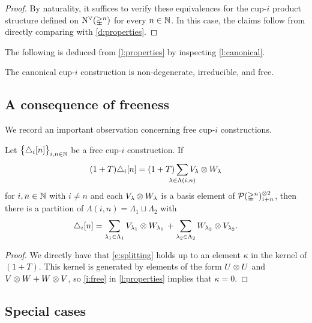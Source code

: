 \begin{proof}
	By naturality, it suffices to verify these equivalences for the \mbox{cup-$i$} product structure defined on $\operatorname{N^{\vee}}(\mathbb{\Delta}^n)$ for every $n \in \mathbb{N}$.
	In this case, the claims follow from directly comparing with \cref{d:properties}.
\end{proof}

The following is deduced from \cref{l:properties} by inspecting \cref{l:canonical}.

\begin{theorem} \label{t:existence}
	The canonical \mbox{cup-$i$} construction is non-degenerate, irreducible, and free.
\end{theorem}

\subsection{A consequence of freeness} \label{ss:consequence}

We record an important observation concerning free cup-$i$ constructions.

\begin{lemma} \label{l:consequence}
	Let $\big\{ \triangle_i [n] \big\}_{i,n\in\mathbb{N}}$ be a free \mbox{cup-$i$} construction.
	If
	\[
	(1+T) \triangle_i [n] =
	(1+T) \sum_{\mathclap{\lambda \in \Lambda(i,n)}} V_\lambda \ot W_\lambda
	\]
	for $i,n \in \mathbb{N}$ with $i \neq n$ and each $V_\lambda \otimes W_\lambda$ is a basis element of $\mathcal{P}(\mathbb{\Delta}^n)^{\otimes 2}_{i+n}$, then there is a partition of $\Lambda(i,n) = \Lambda_1 \sqcup \Lambda_2$ with
	\begin{equation} \label{e:splitting}
	\triangle_i [n] =
	\sum_{\lambda_1 \in \Lambda_1} V_{\lambda_1} \otimes W_{\lambda_1} \, +
	\sum_{\lambda_2 \in \Lambda_2} W_{\lambda_2} \otimes V_{\lambda_2}.
	\end{equation}
\end{lemma}

\begin{proof}
	We directly have that \eqref{e:splitting} holds up to an element $\kappa$ in the kernel of $(1+T)$.
	This kernel is generated by elements of the form $U \otimes U$ and $V \otimes W + W \otimes V$, so \cref{i:free} in \cref{l:properties} implies that $\kappa = 0$.
\end{proof}

\subsection{Special cases} \label{ss:cases}


